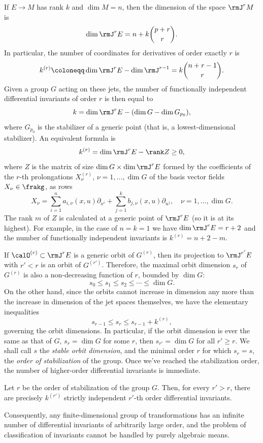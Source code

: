 \begin{rem}
    If $E\to M$ has rank $k$ and $\dim M=n$, then the dimension of the space $\rmJ^r M$ is 
    \[\dim \rmJ^r E=n+k\binom{p+r}{r}.\]
    In particular, the number of coordinates for derivatives of order exactly $r$ is 
    \[k^{(r)}\coloneqq \dim \rmJ^r E-\dim \rmJ^{r-1}=k\binom{n+r-1}{r}.\]
    Given a group $G$ acting on these jets, the number of functionally independent differential invariants of order $r$ is then equal to
    \[k=\dim\rmJ^r E-(\dim G-\dim G_{p_0}),\]
    where $G_{p_0}$ is the stabilizer of a generic point (that is, a lowest-dimensional stabilizer). An equivalent formula is 
    \[k^{(r)}=\dim \rmJ^r E-\rank Z\geq 0,\]
    where $Z$ is the matrix of size $\dim G\times \dim \rmJ^rE$ formed by the coefficients of the $r$-th prolongations $X_\nu^{(r)}$, $\nu=1,\ldots,\dim G$ of the basis vector fields $X_\nu \in\frakg$, as rows 
    \[X_\nu=\sum_{i=1}^n a_{i,\nu}(x,u)\partial_{x^i}+\sum_{j=1}^k b_{j,\nu}(x,u)\partial_{u^j},\quad \nu=1,\ldots,\dim G.\]
    The rank $m$ of $Z$ is calculated at a generic point of $\rmJ^r E$ (so it is at its highest). For example, in the case of $n=k=1$ we have $\dim\rmJ^r E=r+2$ and the number of functionally independent invariants is $k^{(r)}=n+2-m$.

    If $\calO^{(r)}\subset \rmJ^r E$ is a generic orbit of $G^{(r)}$, then its projection to $\rmJ^{r'}E$ with $r'<r$ is an orbit of $G^{(r')}$. Therefore, the maximal orbit dimension $s_r$ of $G^{(r)}$ is also a non-decreasing function of $r$, bounded by $\dim G$:
    \[s_0\leq s_1\leq s_2\leq \cdots \leq \dim G.\]
    On the other hand, since the orbits cannot increase in dimension any more than the increase in dimension of the jet spaces themselves, we have the elementary inequalities 
    \[s_{r-1}\leq s_r\leq s_{r-1}+k^{(r)},\]
    governing the orbit dimensions. In particular, if the orbit dimension is ever the same as that of $G$, $s_r=\dim G$ for some $r$, then $s_{r'}=\dim G$ for all $r'\geq r$. We shall call $s$ the \emph{stable orbit dimension}, and the minimal order $r$ for which $s_r=s$, the \emph{order of stabilization} of the group. Once we've reached the stabilization order, the number of higher-order differential invariants is immediate.

    \begin{prop}
        Let $r$ be the order of stabilization of the group $G$. Then, for every $r'>r$, there are precisely $k^{(r')}$ strictly independent $r'$-th order differential invariants.
    \end{prop}

    Consequently, any finite-dimensional group of transformations has an infinite number of differential invariants of arbitrarily large order, and the problem of classification of invariants cannot be handled by purely algebraic means.
\end{rem}

